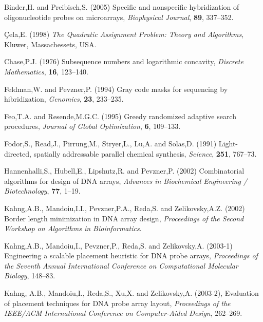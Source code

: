 \documentclass{bioinfo}
\begin{document}
\begin{thebibliography}{}

 Binder,H. and Preibisch,S. (2005) Specific and nonspecific hybridization of oligonucleotide probes on microarrays, {\it Biophysical Journal}, {\bf 89}, 337--352.

 \c{C}ela,E. (1998) {\it The Quadratic Assignment Problem: Theory and Algorithms}, Kluwer, Massachessets, USA.

 Chase,P.J. (1976) Subsequence numbers and logarithmic concavity, {\it Discrete Mathematics}, {\bf 16}, 123--140.

 Feldman,W. and Pevzner,P. (1994) Gray code masks for sequencing by hibridization, {\it Genomics}, {\bf 23}, 233--235.

 Feo,T.A. and Resende,M.G.C. (1995) Greedy randomized adaptive search procedures, {\it Journal of Global Optimization}, {\bf 6}, 109--133.

 Fodor,S., Read,J., Pirrung,M., Stryer,L., Lu,A. and Solas,D. (1991) Light-directed, spatially addressable parallel chemical synthesis, {\it Science}, {\bf 251}, 767--73.

 Hannenhalli,S., Hubell,E., Lipshutz,R. and Pevzner,P. (2002) Combinatorial algorithms for design of DNA arrays, {\it Advances in Biochemical Engineering / Biotechnology}, {\bf 77}, 1--19.

 Kahng,A.B., Mandoiu,I.I., Pevzner,P.A., Reda,S. and Zelikovsky,A.Z. (2002) Border length minimization in DNA array design, {\it Proceedings of the Second Workshop on Algorithms in Bioinformatics}.

 Kahng,A.B., Mandoiu,I., Pevzner,P., Reda,S. and Zelikovsky,A. (2003-1) Engineering a scalable placement heuristic for DNA probe arrays, {\it Proceedings of the Seventh Annual International Conference on Computational Molecular Biology}, 148--83.

 Kahng, A.B., Mandoiu,I., Reda,S., Xu,X. and Zelikovsky,A. (2003-2), Evaluation of placement techniques for DNA probe array layout, {\it Proceedings of the IEEE/ACM International Conference on Computer-Aided Design}, 262--269.


\end{thebibliography}
\end{document}
